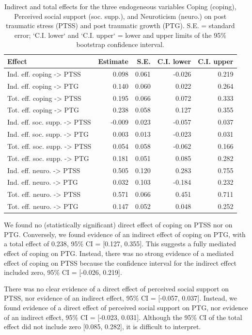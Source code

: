 \documentclass[
  english,
  man,floatsintext]{apa7}
\begin{document}
\begin{table}

\caption{\label{tab:mediation-tab}Indirect and total effects for the three endogeneous variables Coping (coping), Perceived social support (soc. supp.), and Neuroticism (neuro.) on post traumatic stress (PTSS) and post traumatic growth (PTG). S.E. = standard error; `C.I. lower` and `C.I. upper` = lower and upper limits of the 95\% bootstrap confidence interval.}
\centering
\begin{tabular}[t]{lrrrr}
\toprule
Effect & Estimate & S.E. & C.I. lower & C.I. upper\\
\midrule
Ind. eff. coping -> PTSS & 0.098 & 0.061 & -0.026 & 0.219\\
Ind. eff. coping -> PTG & 0.140 & 0.060 & 0.022 & 0.264\\
Tot. eff. coping -> PTSS & 0.195 & 0.066 & 0.072 & 0.333\\
Tot. eff. coping -> PTG & 0.238 & 0.058 & 0.127 & 0.355\\
Ind. eff. soc. supp. -> PTSS & -0.009 & 0.023 & -0.057 & 0.037\\
\addlinespace
Ind. eff. soc. supp. -> PTG & 0.003 & 0.013 & -0.023 & 0.031\\
Tot. eff. soc. supp. -> PTSS & 0.054 & 0.058 & -0.062 & 0.166\\
Tot. eff. soc. supp. -> PTG & 0.181 & 0.051 & 0.085 & 0.282\\
Ind. eff. neuro. -> PTSS & 0.505 & 0.120 & 0.283 & 0.755\\
Ind. eff. neuro. -> PTG & 0.032 & 0.103 & -0.184 & 0.232\\
\addlinespace
Tot. eff. neuro. -> PTSS & 0.571 & 0.066 & 0.451 & 0.711\\
Tot. eff. neuro. -> PTG & 0.147 & 0.052 & 0.048 & 0.252\\
\bottomrule
\end{tabular}
\end{table}

We found no (statistically significant) direct effect of coping on PTSS nor on PTG.
Conversely, we found evidence of an indirect effect of coping on PTG, with a total effect of 0.238, 95\% CI = {[}0.127, 0.355{]}.
This suggests a fully mediated effect of coping on PTG.
Instead, there was no strong evidence of a mediated effect of coping on PTSS because the confidence interval for the indirect effect included zero, 95\% CI = {[}-0.026, 0.219{]}.

There was no clear evidence of a direct effect of perceived social support on PTSS, nor evidence of an indirect effect, 95\% CI = {[}-0.057, 0.037{]}.
Instead, we found evidence of a direct effect of perceived social support on PTG, nor evidence of an indirect effect, 95\% CI = {[}-0.023, 0.031{]}.
Although the 95\% CI of the total effect did not include zero {[}0.085, 0.282{]}, it is difficult to interpret.
\end{document}
